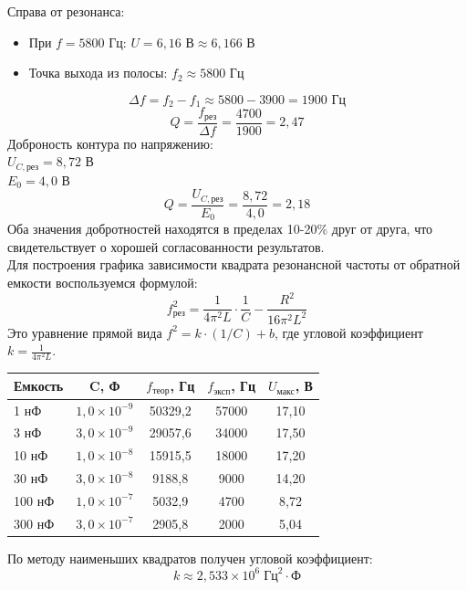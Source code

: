 \documentclass[12pt,fleqn]{article}
\begin{document}
\begin{justify}
    Справа от резонанса:
    \begin{itemize}
        \item При $f = 5800 \text{ Гц}$: $U = 6{,}16 \text{ В} \approx 6{,}166 \text{ В}$
        \item Точка выхода из полосы: $f_2 \approx 5800 \text{ Гц}$
    \end{itemize}
    \[ \Delta f = f_2 - f_1 \approx 5800 - 3900 = 1900 \text{ Гц} \]
    \[ Q = \frac{f_{\text{рез}}}{\Delta f} = \frac{4700}{1900} = 2{,}47 \]
    Доброность контура по напряжению: \\
    $U_{C,\text{рез}} = 8{,}72 \text{ В}$ \\
    $E_0 = 4{,}0 \text{ В}$ \\
    \[ Q = \frac{U_{C,\text{рез}}}{E_0} = \frac{8{,}72}{4{,}0} = 2{,}18 \]
    Оба значения добротностей находятся в пределах 10-20\% друг от друга, что свидетельствует о хорошей согласованности результатов.\\
    Для построения графика зависимости квадрата резонансной частоты от обратной емкости воспользуемся формулой:
    \[ f_{\text{рез}}^2 = \frac{1}{4\pi^2 L} \cdot \frac{1}{C} - \frac{R^2}{16\pi^2 L^2} \]
    Это уравнение прямой вида $f^2 = k \cdot (1/C) + b$, где угловой коэффициент $k = \frac{1}{4\pi^2 L}$.
    \begin{table}[!h]
    \centering
    \small
    \begin{tabular}{|l|c|c|c|c|}
    \hline
    \textbf{Емкость} & \textbf{C, Ф} & \textbf{$f_{\text{теор}}$, Гц} & \textbf{$f_{\text{эксп}}$, Гц} & \textbf{$U_{\text{макс}}$, В} \\ \hline
    1 нФ & $1{,}0\times10^{-9}$ & 50329,2 & 57000 & 17,10 \\ \hline
    3 нФ & $3{,}0\times10^{-9}$ & 29057,6 & 34000 & 17,50 \\ \hline
    10 нФ & $1{,}0\times10^{-8}$ & 15915,5 & 18000 & 17,20 \\ \hline
    30 нФ & $3{,}0\times10^{-8}$ & 9188,8 & 9000 & 14,20 \\ \hline
    100 нФ & $1{,}0\times10^{-7}$ & 5032,9 & 4700 & 8,72 \\ \hline
    300 нФ & $3{,}0\times10^{-7}$ & 2905,8 & 2000 & 5,04 \\ \hline
    \end{tabular}
    \end{table}

    По методу наименьших квадратов получен угловой коэффициент:
    \[ k \approx 2{,}533 \times 10^6 \;\text{Гц}^2 \cdot \text{Ф} \]


\end{justify}
\end{document}

